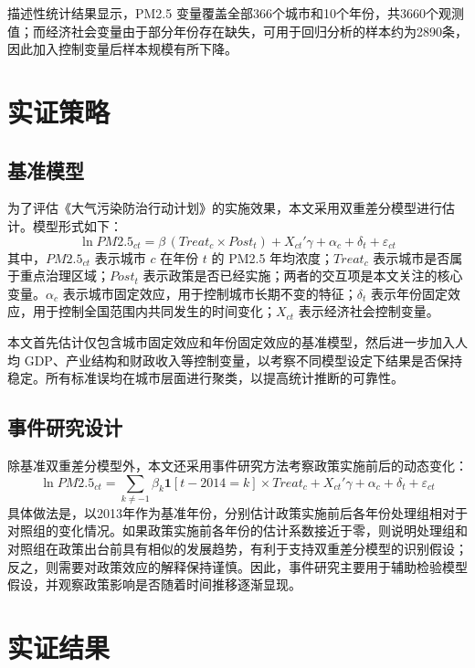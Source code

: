\documentclass[12pt]{article}
\begin{document}
描述性统计结果显示，PM2.5 变量覆盖全部366个城市和10个年份，共3660个观测值；而经济社会变量由于部分年份存在缺失，可用于回归分析的样本约为2890条，因此加入控制变量后样本规模有所下降。

\section{实证策略}

\subsection{基准模型}

为了评估《大气污染防治行动计划》的实施效果，本文采用双重差分模型进行估计。模型形式如下：
\begin{equation}
\ln PM2.5_{ct} = \beta\,(Treat_c \times Post_t) + X_{ct}'\gamma + \alpha_c + \delta_t + \varepsilon_{ct}
\label{eq:did}
\end{equation}
其中，$PM2.5_{ct}$ 表示城市 $c$ 在年份 $t$ 的 PM2.5 年均浓度；$Treat_c$ 表示城市是否属于重点治理区域；$Post_t$ 表示政策是否已经实施；两者的交互项是本文关注的核心变量。$\alpha_c$ 表示城市固定效应，用于控制城市长期不变的特征；$\delta_t$ 表示年份固定效应，用于控制全国范围内共同发生的时间变化；$X_{ct}$ 表示经济社会控制变量。

本文首先估计仅包含城市固定效应和年份固定效应的基准模型，然后进一步加入人均 GDP、产业结构和财政收入等控制变量，以考察不同模型设定下结果是否保持稳定。所有标准误均在城市层面进行聚类，以提高统计推断的可靠性。

\subsection{事件研究设计}

除基准双重差分模型外，本文还采用事件研究方法考察政策实施前后的动态变化：
\begin{equation}
\ln PM2.5_{ct} = \sum_{k \neq -1} \beta_k \mathbf{1}[t - 2014 = k] \times Treat_c + X_{ct}'\gamma + \alpha_c + \delta_t + \varepsilon_{ct}
\label{eq:es}
\end{equation}
具体做法是，以2013年作为基准年份，分别估计政策实施前后各年份处理组相对于对照组的变化情况。如果政策实施前各年份的估计系数接近于零，则说明处理组和对照组在政策出台前具有相似的发展趋势，有利于支持双重差分模型的识别假设；反之，则需要对政策效应的解释保持谨慎。因此，事件研究主要用于辅助检验模型假设，并观察政策影响是否随着时间推移逐渐显现。

\section{实证结果}
\end{document}
